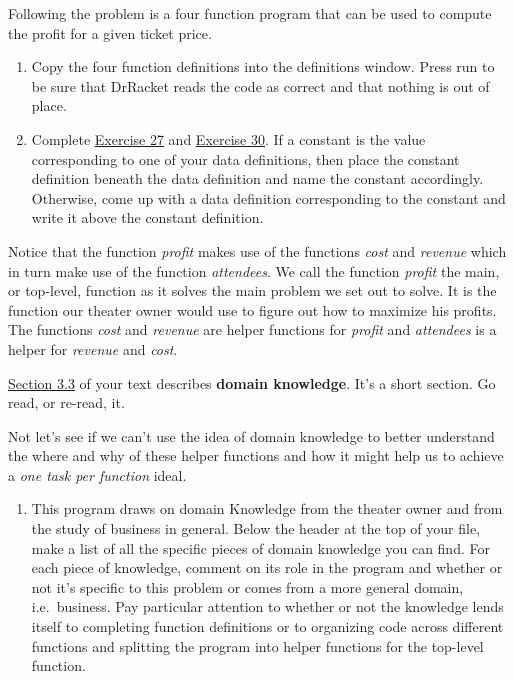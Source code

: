 \documentclass[nobib]{tufte-handout}
\begin{document}
Following the problem is a four function program that can be used to compute the profit for a given ticket price.

\begin{enumerate}[resume]
  \item Copy the four function definitions into the definitions window. Press run to be sure that DrRacket reads the code as correct and that nothing is out of place.

  \item Complete \href{http://htdp.org/2018-01-06/Book/part_one.html#%28counter._%28exercise._fun6-constant%29%29}{Exercise 27} and \href{http://htdp.org/2018-01-06/Book/part_one.html#%28counter._%28exercise._constant1%29%29}{Exercise 30}\sidenote{Review section 2.4 if you're stuck or confused here.}. If a constant is the value corresponding to one of your data definitions, then place the constant definition beneath the data definition and name the constant accordingly. Otherwise, come up with a data definition corresponding to the constant and write it above the constant definition.
\end{enumerate}

Notice that the function \textit{profit} makes use of the functions \textit{cost} and \textit{revenue} which in turn make use of the function \textit{attendees}. We call the function \textit{profit} the main, or top-level, function as it solves the main problem we set out to solve. It is the function our theater owner would use to figure out how to maximize his profits. The functions \textit{cost} and \textit{revenue} are helper functions for \textit{profit} and \textit{attendees} is a helper for \textit{revenue} and \textit{cost}.

 \href{http://htdp.org/2018-01-06/Book/part_one.html#%28part._sec~3adomain%29}{Section 3.3} of your text describes \textbf{domain knowledge}. It's a short section. Go read, or re-read, it.
\vspace{.25in}

Not let's see if we can't use the idea of domain knowledge to better understand the where and why of these helper functions and how it might help us to achieve a \textit{one task per function} ideal.
\begin{enumerate}[resume]
  \item This program draws on domain Knowledge from the theater owner and from the study of business in general. Below the header at the top of your file, make a list of all the specific pieces of domain knowledge you can find.  For each piece of knowledge, comment on its role in the program and whether or not it's specific to this problem or comes from a more general domain, i.e.\ business. Pay particular attention to whether or not the knowledge lends itself to completing function definitions or to organizing code across different functions and splitting the program into helper functions for the top-level function.
\end{enumerate}
\end{document}
